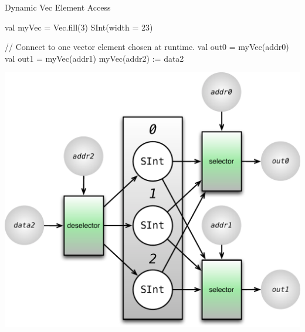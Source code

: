\documentclass[xcolor=pdflatex,dvipsnames,table]{beamer}
\begin{document}
\begin{frame}[fragile]{Dynamic Vec Element Access}
\begin{scala}
val myVec = Vec.fill(3) { SInt(width = 23) } 

// Connect to one vector element chosen at runtime.
val out0      = myVec(addr0)
val out1      = myVec(addr1)
myVec(addr2) := data2
\end{scala}

\begin{center}
\includegraphics[height=0.6\textheight]{figs/vec-3-dynamic.pdf} 
\end{center}
\end{frame}
\end{document}
